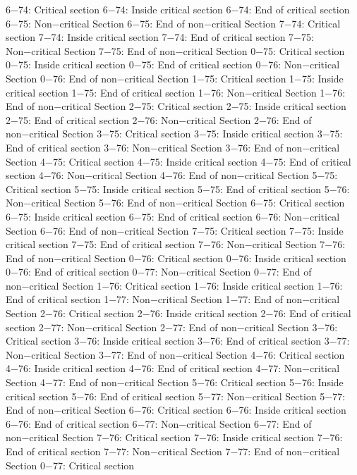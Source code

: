 6−74: Critical section
6−74: Inside critical section
6−74: End of critical section
6−75: Non−critical Section
6−75: End of non−critical Section
7−74: Critical section
7−74: Inside critical section
7−74: End of critical section
7−75: Non−critical Section
7−75: End of non−critical Section
0−75: Critical section
0−75: Inside critical section
0−75: End of critical section
0−76: Non−critical Section
0−76: End of non−critical Section
1−75: Critical section
1−75: Inside critical section
1−75: End of critical section
1−76: Non−critical Section
1−76: End of non−critical Section
2−75: Critical section
2−75: Inside critical section
2−75: End of critical section
2−76: Non−critical Section
2−76: End of non−critical Section
3−75: Critical section
3−75: Inside critical section
3−75: End of critical section
3−76: Non−critical Section
3−76: End of non−critical Section
4−75: Critical section
4−75: Inside critical section
4−75: End of critical section
4−76: Non−critical Section
4−76: End of non−critical Section
5−75: Critical section
5−75: Inside critical section
5−75: End of critical section
5−76: Non−critical Section
5−76: End of non−critical Section
6−75: Critical section
6−75: Inside critical section
6−75: End of critical section
6−76: Non−critical Section
6−76: End of non−critical Section
7−75: Critical section
7−75: Inside critical section
7−75: End of critical section
7−76: Non−critical Section
7−76: End of non−critical Section
0−76: Critical section
0−76: Inside critical section
0−76: End of critical section
0−77: Non−critical Section
0−77: End of non−critical Section
1−76: Critical section
1−76: Inside critical section
1−76: End of critical section
1−77: Non−critical Section
1−77: End of non−critical Section
2−76: Critical section
2−76: Inside critical section
2−76: End of critical section
2−77: Non−critical Section
2−77: End of non−critical Section
3−76: Critical section
3−76: Inside critical section
3−76: End of critical section
3−77: Non−critical Section
3−77: End of non−critical Section
4−76: Critical section
4−76: Inside critical section
4−76: End of critical section
4−77: Non−critical Section
4−77: End of non−critical Section
5−76: Critical section
5−76: Inside critical section
5−76: End of critical section
5−77: Non−critical Section
5−77: End of non−critical Section
6−76: Critical section
6−76: Inside critical section
6−76: End of critical section
6−77: Non−critical Section
6−77: End of non−critical Section
7−76: Critical section
7−76: Inside critical section
7−76: End of critical section
7−77: Non−critical Section
7−77: End of non−critical Section
0−77: Critical section
